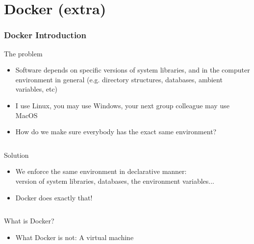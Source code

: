 \documentclass[fleqn,aspectratio=169,10pt]{beamer}
\begin{document}
\begin{frame}[fragile]
\begin{columns}
\begin{column}{.4\linewidth}
\begin{figure}[]
      \end{figure}
    \end{column}
  \end{columns}
\end{frame}

\section{Docker (extra)}
\begin{frame}
  \frametitle{Docker Introduction}
  \vspace*{-1.5ex}
  \pause
  \begin{block}{The problem}
    \begin{itemize}
      \item Software depends on specific versions of system libraries, and in the computer environment in general (e.g. directory structures, databases, ambient variables, etc)
            \pause
      \item I use Linux, you may use Windows, your next group colleague may use MacOS
            \pause
      \item How do we make sure everybody has the exact same environment?
    \end{itemize}
    \pause
  \vspace*{-2ex}
    \begin{columns}
      \begin{column}{.95\textwidth}
        \begin{block}{Solution}
          \begin{itemize}
            \item We enforce the same environment in declarative manner: \\ version of system libraries, databases, the environment variables...
            \item Docker does exactly that!
          \end{itemize}
        \end{block}
      \end{column}
    \end{columns}
  \end{block}
  \vspace*{-1.8ex}
  \pause
  \begin{columns}
    \begin{column}{.45\textwidth}
  \begin{block}{What is Docker?}
    \begin{itemize}
            \pause
      \item What Docker is not: A virtual machine

\end{itemize}
\end{block}
\end{column}
\end{columns}
\end{frame}
\end{document}
